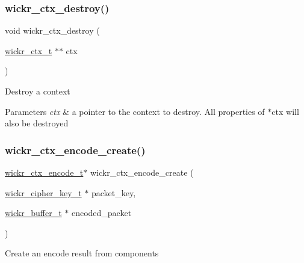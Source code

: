 \subsubsection{\texorpdfstring{wickr\+\_\+ctx\+\_\+destroy()}{wickr\_ctx\_destroy()}}
{\footnotesize\ttfamily void wickr\+\_\+ctx\+\_\+destroy (\begin{DoxyParamCaption}\item[{\mbox{\hyperlink{structwickr__ctx}{wickr\+\_\+ctx\+\_\+t}} $\ast$$\ast$}]{ctx }\end{DoxyParamCaption})}

Destroy a context


\begin{DoxyParams}{Parameters}
{\em ctx} & a pointer to the context to destroy. All properties of \textquotesingle{}$\ast$ctx\textquotesingle{} will also be destroyed \\
\hline
\end{DoxyParams}
\mbox{\label{group__wickr__ctx_ga810ee459cb0ab1037b5fd1f983d0ded3}} 
\subsubsection{\texorpdfstring{wickr\+\_\+ctx\+\_\+encode\+\_\+create()}{wickr\_ctx\_encode\_create()}}
{\footnotesize\ttfamily \mbox{\hyperlink{structwickr__ctx__encode}{wickr\+\_\+ctx\+\_\+encode\+\_\+t}}$\ast$ wickr\+\_\+ctx\+\_\+encode\+\_\+create (\begin{DoxyParamCaption}\item[{\mbox{\hyperlink{structwickr__cipher__key}{wickr\+\_\+cipher\+\_\+key\+\_\+t}} $\ast$}]{packet\+\_\+key,  }\item[{\mbox{\hyperlink{structwickr__buffer}{wickr\+\_\+buffer\+\_\+t}} $\ast$}]{encoded\+\_\+packet }\end{DoxyParamCaption})}

Create an encode result from components


